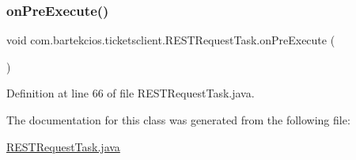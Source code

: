 \subsubsection{\texorpdfstring{on\+Pre\+Execute()}{onPreExecute()}}
{\footnotesize\ttfamily void com.\+bartekcios.\+ticketsclient.\+R\+E\+S\+T\+Request\+Task.\+on\+Pre\+Execute (\begin{DoxyParamCaption}{ }\end{DoxyParamCaption})\hspace{0.3cm}{\ttfamily [protected]}}



Definition at line 66 of file R\+E\+S\+T\+Request\+Task.\+java.



The documentation for this class was generated from the following file\+:\begin{DoxyCompactItemize}
\item 
\hyperlink{_r_e_s_t_request_task_8java}{R\+E\+S\+T\+Request\+Task.\+java}\end{DoxyCompactItemize}
